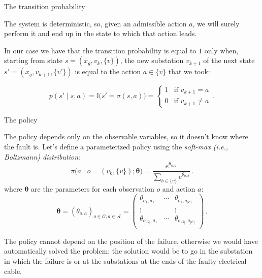 \documentclass[10pt, aspectratio=169, compress, protectframetitle, handout]{beamer}
\begin{document}
\begin{frame}{The transition probability}
    
    The system is \alert{deterministic}, so, given an admissible action $a$, we will surely perform it and end up in the state to which that action leads.
    
    In our case we have that the \alert{transition probability} is equal to $1$ only when, starting from state $s = (x_g, v_k, \{v\})$, the new substation $v_{k+1}$ of the next state $s' = (x_g, v_{k+1}, \{v'\})$ is equal to the action $a \in \{v\}$ that we took:
    
    \begin{equation*}
        p(s' \mid s, a) = \mathbb I\big(s' = \sigma(s, a)\big) =
        \begin{cases}
            1 & \text{if } v_{k+1} = a \\
            0 & \text{if } v_{k+1} \neq a
        \end{cases} \,.
    \end{equation*}
    
\end{frame}

\begin{frame}{The policy}

    The \alert{policy} depends only on the observable variables, so it doesn't know where the fault is. Let's define a parameterized policy using the \emph{soft-max (i.e., Boltzmann) distribution}:
    \begin{equation*}
        \pi \Big( a \;\big|\; o=(v_k, \{v\}); \boldsymbol \theta \Big) = \frac{e^{\theta_{o,a} }}{\sum_{b \in \{v\}} e^{\theta_{o,b} }} \,.
    \end{equation*}
    where $\boldsymbol \theta$ are the parameters for each observation $o$ and action $a$:
    \begin{equation*}
        \boldsymbol \theta = (\theta_{o,a})_{o \in \mathcal O, a \in \mathcal A} = \begin{pmatrix}
        \theta_{o_1, a_1} & \cdots & \theta_{o_1, a_{|\mathcal C|}} \\
        \vdots            &                   & \vdots            \\
        \theta_{o_{|O|}, a_1} & \cdots &  \theta_{o_{|O|}, a_{|\mathcal C|}} \\
        \end{pmatrix} \, .
    \end{equation*}
    
    The policy cannot depend on the position of the failure, otherwise we would have automatically solved the problem: the solution would be to go in the substation in which the failure is or at the substations at the ends of the faulty electrical cable.
    
\end{frame}
\end{document}
